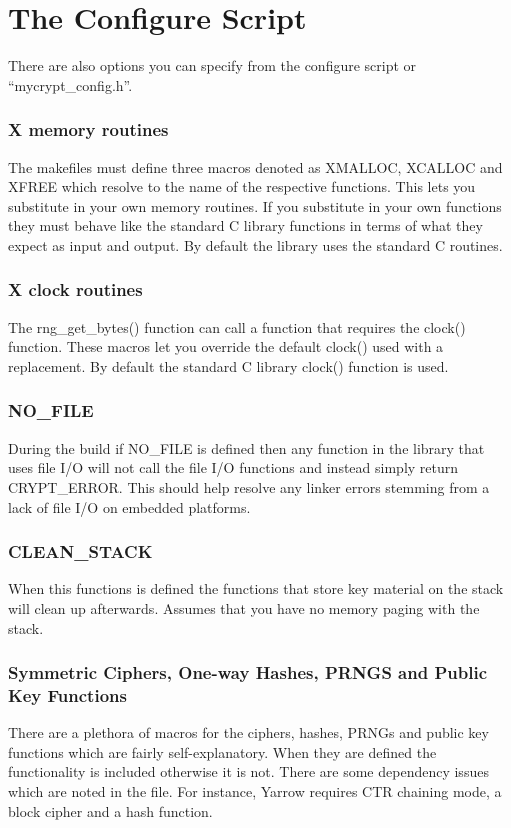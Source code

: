 \documentclass[b5paper]{book}
\begin{document}
\section{The Configure Script}
There are also options you can specify from the configure script or ``mycrypt\_config.h''.  

\subsubsection{X memory routines}
The makefiles must define three macros denoted as XMALLOC, XCALLOC and XFREE which resolve to the name of the respective
functions.  This lets you substitute in your own memory routines.  If you substitute in your own functions they must behave
like the standard C library functions in terms of what they expect as input and output.  By default the library uses the
standard C routines.

\subsubsection{X clock routines}
The rng\_get\_bytes() function can call a function that requires the clock() function.  These macros let you override
the default clock() used with a replacement.  By default the standard C library clock() function is used.

\subsubsection{NO\_FILE}
During the build if NO\_FILE is defined then any function in the library that uses file I/O will not call the file I/O 
functions and instead simply return CRYPT\_ERROR.  This should help resolve any linker errors stemming from a lack of
file I/O on embedded platforms.

\subsubsection{CLEAN\_STACK}
When this functions is defined the functions that store key material on the stack will clean up afterwards.  Assumes that
you have no memory paging with the stack.

\subsubsection{Symmetric Ciphers, One-way Hashes, PRNGS and Public Key Functions}
There are a plethora of macros for the ciphers, hashes, PRNGs and public key functions which are fairly self-explanatory.  
When they are defined the functionality is included otherwise it is not.  There are some dependency issues which are
noted in the file.  For instance, Yarrow requires CTR chaining mode, a block cipher and a hash function.
\end{document}
